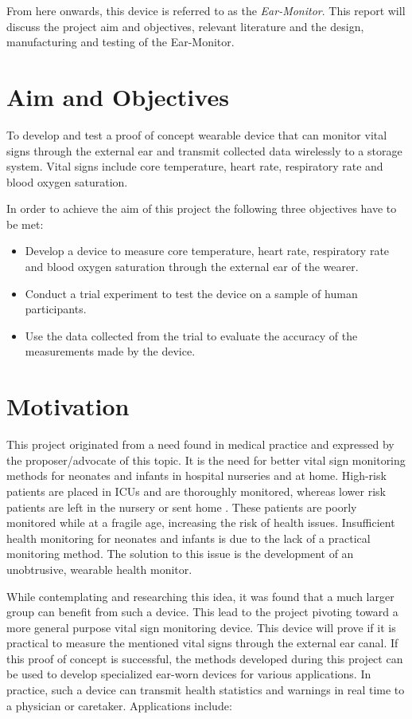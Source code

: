 \medskip
From here onwards, this device is referred to as the \textit{Ear-Monitor}. This report will discuss the project aim and objectives, relevant literature and the design, manufacturing and testing of the Ear-Monitor.

\section{Aim and Objectives}
To develop and test a proof of concept wearable device that can monitor vital signs through the external ear and transmit collected data wirelessly to a storage system. Vital signs include core temperature, heart rate, respiratory rate and blood oxygen saturation.

\medskip

In order to achieve the aim of this project the following three objectives have to be met:
\begin{itemize}
\item Develop a device to measure core temperature, heart rate, respiratory rate and blood oxygen saturation through the external ear of the wearer.
\item Conduct a trial experiment to test the device on a sample of human participants.
\item Use the data collected from the trial to evaluate the accuracy of the measurements made by the device.
\end{itemize}

\section{Motivation}
This project originated from a need found in medical practice and expressed by the proposer/advocate of this topic. It is the need for better vital sign monitoring methods for neonates and infants in hospital nurseries and at home. High-risk patients are placed in ICUs and are thoroughly monitored, whereas lower risk patients are left in the nursery or sent home \citep{barfield2012american}. These patients are poorly monitored while at a fragile age, increasing the risk of health issues. Insufficient health monitoring for neonates and infants is due to the lack of a practical monitoring method. The solution to this issue is the development of an unobtrusive, wearable health monitor.

\medskip

While contemplating and researching this idea, it was found that a much larger group can benefit from such a device. This lead to the project pivoting toward a more general purpose vital sign monitoring device. This device will prove if it is practical to measure the mentioned vital signs through the external ear canal. If this proof of concept is successful, the methods developed during this project can be used to develop specialized ear-worn devices for various applications. In practice, such a device can transmit health statistics and warnings in real time to a physician or caretaker. Applications include:

